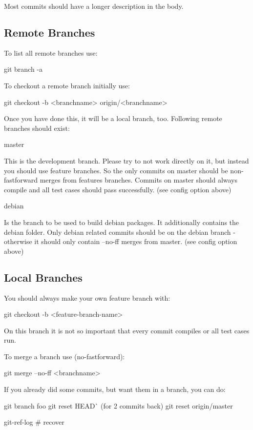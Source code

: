 Most commits should have a longer description in the body.

\subsection*{Remote Branches}

To list all remote branches use\+: \begin{DoxyVerb}    git branch -a
\end{DoxyVerb}


To checkout a remote branch initially use\+: \begin{DoxyVerb}    git checkout -b <branchname> origin/<branchname>
\end{DoxyVerb}


Once you have done this, it will be a local branch, too. Following remote branches should exist\+: \begin{DoxyVerb}    master
\end{DoxyVerb}


This is the development branch. Please try to not work directly on it, but instead you should use feature branches. So the only commits on master should be non-\/fastforward merges from features branches. Commits on master should always compile and all test cases should pass successfully. (see config option above) \begin{DoxyVerb}    debian
\end{DoxyVerb}


Is the branch to be used to build debian packages. It additionally contains the debian folder. Only debian related commits should be on the debian branch -\/ otherwise it should only contain --no-\/ff merges from master. (see config option above)

\subsection*{Local Branches}

You should always make your own feature branch with\+: \begin{DoxyVerb}    git checkout -b <feature-branch-name>
\end{DoxyVerb}


On this branch it is not so important that every commit compiles or all test cases run.

To merge a branch use (no-\/fastforward)\+: \begin{DoxyVerb}    git merge --no-ff <branchname>
\end{DoxyVerb}


If you already did some commits, but want them in a branch, you can do\+: \begin{DoxyVerb}    git branch foo
    git reset HEAD^^  (for 2 commits back)
    git reset origin/master

    git-ref-log # recover\end{DoxyVerb}
 
